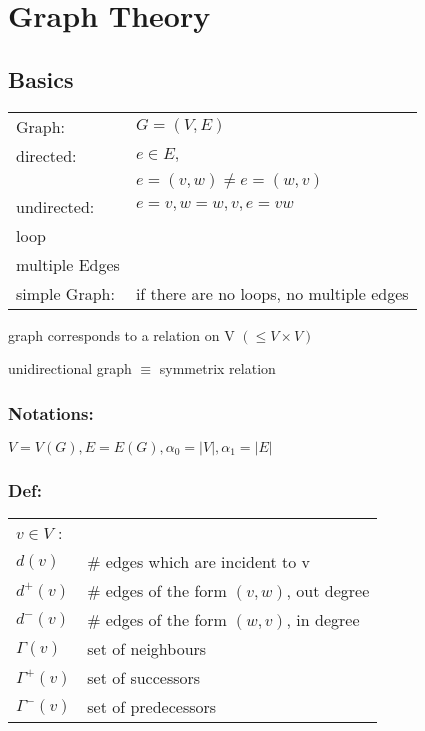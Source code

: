 \section{Graph Theory}
\subsection{Basics}

\begin{tabular}{l l}
Graph:& $G = (V,E)$ \\

directed:& $ e \in E,$ \\
	& $ e = (v,w) \neq e=(w,v)$ \\

undirected:& $ e = {v,w} = {w,v}, e = vw$\\

loop \\

multiple Edges \\

simple Graph: & if there are no loops, no multiple edges \\


\end{tabular}

graph corresponds to a relation on V $(\leq V \times V)$

unidirectional graph $\equiv$ symmetrix relation

\subsubsection*{Notations:}
$V = V(G), E = E(G), \alpha_0 = |V|, \alpha_1 = |E|$ 

\subsubsection*{Def:}

\begin{tabular}{l l}
$v \in V$ : \\
$d(v)$		& \# edges which are incident to v \\

$d^+(v)$	& \# edges of the form $(v,w)$, out degree \\
$d^-(v)$	& \# edges of the form $(w,v)$, in degree \\

$\Gamma(v)$ & set of neighbours \\
$\Gamma^+(v)$ & set of successors \\
$\Gamma^-(v)$ & set of predecessors \\

\end{tabular}


